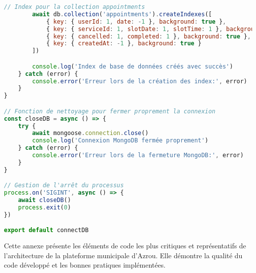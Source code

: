 \begin{lstlisting}[language=JavaScript, caption=mongodb.js - Configuration MongoDB]
        // Index pour la collection appointments
        await db.collection('appointments').createIndexes([
            { key: { userId: 1, date: -1 }, background: true },
            { key: { serviceId: 1, slotDate: 1, slotTime: 1 }, background: true },
            { key: { cancelled: 1, completed: 1 }, background: true },
            { key: { createdAt: -1 }, background: true }
        ])

        console.log('Index de base de données créés avec succès')
    } catch (error) {
        console.error('Erreur lors de la création des index:', error)
    }
}

// Fonction de nettoyage pour fermer proprement la connexion
const closeDB = async () => {
    try {
        await mongoose.connection.close()
        console.log('Connexion MongoDB fermée proprement')
    } catch (error) {
        console.error('Erreur lors de la fermeture MongoDB:', error)
    }
}

// Gestion de l'arrêt du processus
process.on('SIGINT', async () => {
    await closeDB()
    process.exit(0)
})

export default connectDB
\end{lstlisting}

Cette annexe présente les éléments de code les plus critiques et représentatifs de l'architecture de la plateforme municipale d'Azrou. Elle démontre la qualité du code développé et les bonnes pratiques implémentées.

